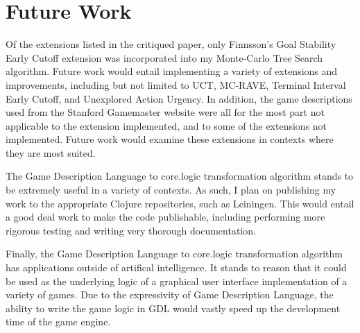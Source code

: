 \documentclass[letterpaper]{article}
\begin{document}
\section{Future Work}

Of the extensions listed in the critiqued paper, only Finnsson's Goal Stability Early Cutoff extension was incorporated into my Monte-Carlo Tree Search algorithm. Future work would entail implementing a variety of extensions and improvements, including but not limited to UCT, MC-RAVE, Terminal Interval Early Cutoff, and Unexplored Action Urgency. In addition, the game descriptions used from the Stanford Gamemaster website were all for the most part not applicable to the extension implemented, and to some of the extensions not implemented. Future work would examine these extensions in contexts where they are most suited.

The Game Description Language to core.logic transformation algorithm stands to be extremely useful in a variety of contexts. As such, I plan on publishing my work to the appropriate Clojure repositories, such as Leiningen. This would entail a good deal work to make the code publishable, including performing more rigorous testing and writing very thorough documentation.

Finally, the Game Description Language to core.logic transformation algorithm has applications outside of artifical intelligence. It stands to reason that it could be used as the underlying logic of a graphical user interface implementation of a variety of games. Due to the expressivity of Game Description Language, the ability to write the game logic in GDL would vastly speed up the development time of the game engine.




\end{document}
